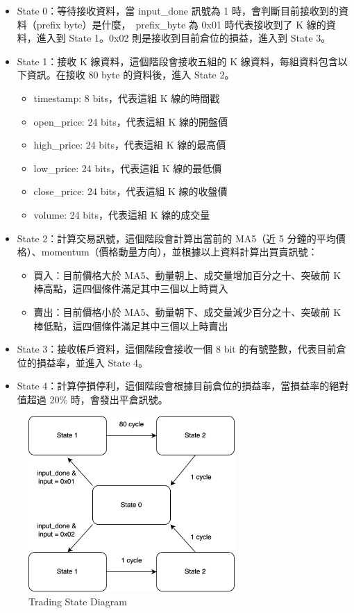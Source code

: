 \documentclass[10.5pt,compsoc,UTF8]{CjC}
\theoremstyle{mystyle}
\begin{document}
\begin{itemize}
  \item State 0：等待接收資料，當 input\_done 訊號為 1 時，會判斷目前接收到的資料（prefix byte）是什麼，\
        prefix\_byte 為 0x01 時代表接收到了 K 線的資料，進入到 State 1。0x02 則是接收到目前倉位的損益，進入到 State 3。
  \item State 1：接收 K 線資料，這個階段會接收五組的 K 線資料，每組資料包含以下資訊。在接收 80 byte 的資料後，進入 State 2。
  \begin{itemize}
    \item timestamp: 8 bits，代表這組 K 線的時間戳
    \item open\_price: 24 bits，代表這組 K 線的開盤價
    \item high\_price: 24 bits，代表這組 K 線的最高價
    \item low\_price: 24 bits，代表這組 K 線的最低價
    \item close\_price: 24 bits，代表這組 K 線的收盤價
    \item volume: 24 bits，代表這組 K 線的成交量
  \end{itemize}
  \item State 2：計算交易訊號，這個階段會計算出當前的 MA5（近 5 分鐘的平均價格）、momentum（價格動量方向），並根據以上資料計算出買賣訊號：
  \begin{itemize}
    \item 買入：目前價格大於 MA5、動量朝上、成交量增加百分之十、突破前 K 棒高點，這四個條件滿足其中三個以上時買入
    \item 賣出：目前價格小於 MA5、動量朝下、成交量減少百分之十、突破前 K 棒低點，這四個條件滿足其中三個以上時賣出
  \end{itemize}
  \item State 3：接收帳戶資料，這個階段會接收一個 8 bit 的有號整數，代表目前倉位的損益率，並進入 State 4。
  \item State 4：計算停損停利，這個階段會根據目前倉位的損益率，當損益率的絕對值超過 20\% 時，會發出平倉訊號。
\end{itemize}

\begin{figure}[!h]
  \centering
  \includegraphics[width=0.7\textwidth]{./img/Trade.png}
  \caption{Trading State Diagram}
\end{figure}
\end{document}
